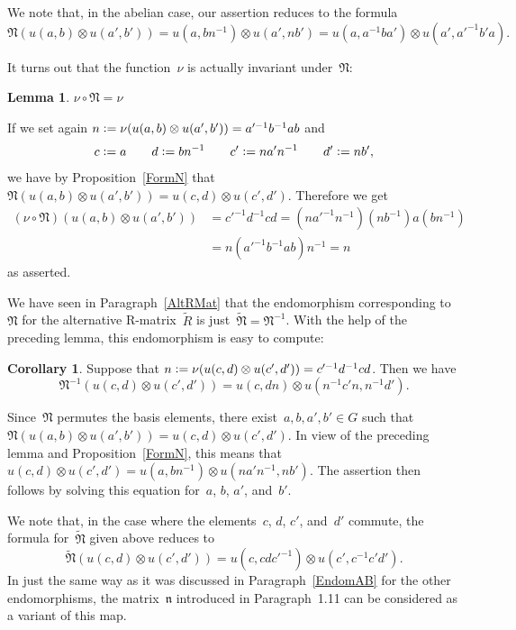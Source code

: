 \documentclass[12pt]{article}
\makeatletter
\theoremstyle{definition}
\newtheorem{Lemma}[Satz]{Lemma}
\newtheorem{Cor}[Satz]{Corollary}
\theoremstyle{break}
\renewenvironment{proof}[1][\proofname]{\par
\vspace{-5pt}%
\pushQED{\qed}%
\normalfont
\topsep0pt \partopsep0pt %
\trivlist
\item[\hskip\labelsep
\bfseries
#1\@addpunct{.}]\ignorespaces
}{%
\popQED\endtrivlist\@endpefalse
\addvspace{6pt plus 6pt} %
}
\newcommand{\fN}{\mathfrak{N}}
\newcommand{\fn}{\mathfrak{n}}
\renewcommand{\1}{\mathbbm{1}}
\newcommand{\ot}{\mathbin{\otimes}}
\newcommand{\uu}{u}
\newcommand{\n}{\nu}
\newcommand{\deq}{\vcentcolon =}
\makeatother
\begin{document}
We note that, in the abelian case, our assertion reduces to the formula
\[\fN(\uu(a,b) \ot \uu(a',b')) =
\uu(a,b n^{-1}) \ot \uu(a',n b') =
\uu(a,a^{-1} b a') \ot \uu(a', a'^{-1} b' a). \]

It turns out that the function~$\n$ is actually invariant under~$\fN$:
\begin{Lemma} \label{InvarN}
$\n \circ \fN = \n$
\end{Lemma}
\begin{proof}
If we set again
$n \deq \n(\uu(a,b) \ot \uu(a',b')) = a'^{-1} b^{-1} a b$
and
\[c \deq a \qquad d \deq b n^{-1} \qquad c' \deq n a' n^{-1} \qquad d' \deq n b', \]
we have by Proposition~\ref{FormN} that
$\fN(\uu(a,b) \ot \uu(a',b')) = \uu(c,d) \ot \uu(c',d')$. Therefore we get
\begin{align*}
(\n \circ \fN)(\uu(a,b) \ot \uu(a',b')) &= c'^{-1} d^{-1} c d
= (n a'^{-1} n^{-1}) (n b^{-1}) a (b n^{-1}) \\
&= n (a'^{-1} b^{-1} a b) n^{-1} = n
\end{align*}
as asserted.
\end{proof}

We have seen in Paragraph~\ref{AltRMat} that the endomorphism corresponding to~$\fN$ for the alternative R-matrix~$\tilde{R}$ is just~$\tilde{\fN} = \fN^{-1}$. With the help of the preceding lemma, this endomorphism is easy to compute:
\begin{Cor} \label{InvN}
Suppose that $n \deq \n(\uu(c,d) \ot \uu(c',d')) = c'^{-1} d^{-1} c d$. Then we have
\[\fN^{-1}(\uu(c,d) \ot \uu(c',d')) =
\uu(c,d n) \ot \uu(n^{-1} c' n, n^{-1} d').\]
\end{Cor}
\begin{proof}
Since~$\fN$ permutes the basis elements, there exist~$a,b,a',b' \in G$ such that
$\fN(\uu(a,b) \ot \uu(a',b')) = \uu(c,d) \ot \uu(c',d')$. In view of the preceding lemma and Proposition~\ref{FormN}, this means that
$\uu(c,d) \ot \uu(c',d') = \uu(a, b n^{-1}) \ot \uu(n a' n^{-1}, n b')$. The assertion then follows by solving this equation for~$a$, $b$, $a'$, and~$b'$.
\end{proof}

We note that, in the case where the elements~$c$, $d$, $c'$, and~$d'$ commute, the formula for~$\tilde{\fN}$ given above reduces to
\[\tilde{\fN}(\uu(c,d) \ot \uu(c',d')) =
\uu(c, c d c'^{-1}) \ot \uu(c', c^{-1} c' d').\]
In just the same way as it was discussed in Paragraph~\ref{EndomAB} for the other endomorphisms, the matrix~$\fn$ introduced in Paragraph~1.11 can be considered as a variant of this map.
\end{document}
